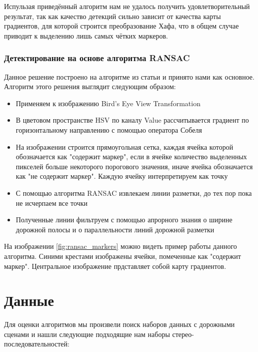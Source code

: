 \documentclass[aps,%
14pt,%
final,%
oneside,
onecolumn,%
musixtex, %
superscriptaddress,%
centertags]{extarticle} %
\begin{document}
Испульзая приведённый алгоритм нам не удалось получить удовлетворительный результат, так как качество детекций сильно зависит от качества карты градиентов, для которой строится преобразование Хафа, что в общем случае приводит к выделению лишь самых чётких маркеров.

\subsubsection*{Детектирование на основе алгоритма RANSAC}
Данное решение построено на алгоритме из статьи \cite{aly2008real} и принято нами как основное. Алгоритм этого решения выглядит следующим образом:
\begin{itemize}
    \item Применяем к изображению Bird's Eye View Transformation
    \item В цветовом пространстве HSV по каналу Value рассчитывается градиент по горизонтальному направлению с помощью оператора Собеля
    \item На изображении строится прямоугольная сетка, каждая ячейка которой обозначается как "содержит маркер", если в ячейке количество выделенных пикселей больше некоторого порогового значения, иначе ячейка обозначается как "не содержит маркер". Каждую ячейку интерпретируем как точку
    \item С помощью алгоритма RANSAC извлекаем линии разметки, до тех пор пока не исчерпаем все точки
    \item Полученные линии фильтруем с помощью апрорного знания о ширине дорожной полосы и о параллельности линий дорожной разметки
\end{itemize}

На изображении \ref{fig:ransac_markers} можно видеть пример работы данного алгоритма. Синими крестами изображены ячейки, помеченные как "содержит маркер". Центральное изображение прдставляет собой карту градиентов.

\section{Данные}

Для оценки алгоритмов мы произвели поиск наборов данных с дорожными сценами и нашли следующие подходящие нам наборы стерео-последовательностей:
\end{document}
